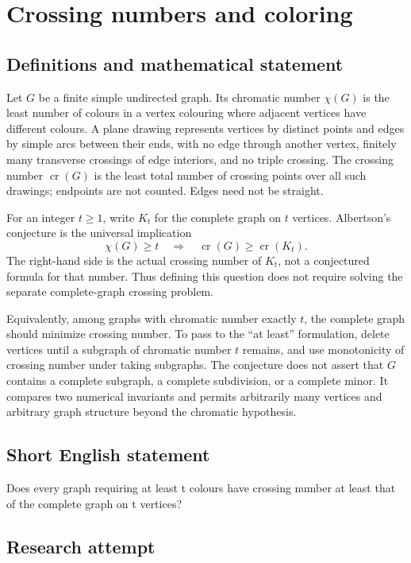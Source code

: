 \documentclass[11pt,a4paper]{article}
\begin{document}
\section*{Crossing numbers and coloring}\label{statement}

\subsection{Definitions and mathematical statement}
Let $G$ be a finite simple undirected graph. Its chromatic number
$\chi(G)$ is the least number of colours in a vertex colouring
where adjacent vertices have different colours. A plane drawing
represents vertices by distinct points and edges by simple arcs
between their ends, with no edge through another vertex, finitely
many transverse crossings of edge interiors, and no triple crossing.
The crossing number $\operatorname{cr}(G)$ is the least total number
of crossing points over all such drawings; endpoints are not counted.
Edges need not be straight.

For an integer $t\ge1$, write $K_t$ for the complete graph on $t$
vertices. Albertson's conjecture is the universal implication
\[
                          \chi(G)\ge t
                 \quad\Longrightarrow\quad
                          \operatorname{cr}(G)\ge\operatorname{cr}(K_t).
\]
The right-hand side is the actual crossing number of $K_t$, not a
conjectured formula for that number. Thus defining this question
does not require solving the separate complete-graph crossing problem.

Equivalently, among graphs with chromatic number exactly $t$, the
complete graph should minimize crossing number. To pass to the
``at least'' formulation, delete vertices until a subgraph of
chromatic number $t$ remains, and use monotonicity of crossing number
under taking subgraphs. The conjecture does not assert that $G$
contains a complete subgraph, a complete subdivision, or a complete
minor. It compares two numerical invariants and permits arbitrarily
many vertices and arbitrary graph structure beyond the chromatic
hypothesis.
\subsection{Short English statement}
Does every graph requiring at least t colours have crossing number at least that of the complete graph on t vertices?
\subsection{Research attempt}
\end{document}
